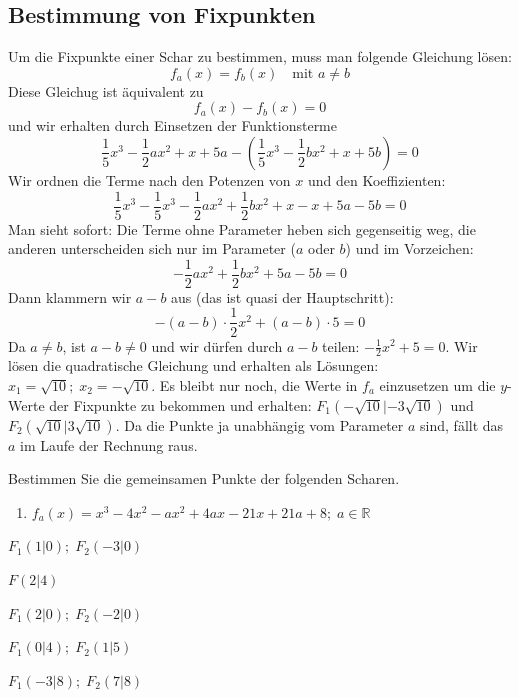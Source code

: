 \documentclass[11pt,a4paper,twoside,fleqn]{article}
\begin{document}
\subsection{Bestimmung von Fixpunkten}
Um die Fixpunkte einer Schar zu bestimmen, muss man folgende Gleichung
lösen:
$$f_a(x)=f_b(x)\quad \textrm{mit } a\neq b$$
Diese Gleichug ist äquivalent zu 
$$ f_a(x)-f_b(x)=0$$
und wir erhalten durch Einsetzen der Funktionsterme
$$\frac 1 5 x^3 -\frac 1 2 ax^2 +x+5a 
-
\left(\frac 1 5 x^3 -\frac 1 2 bx^2+x+5b\right)=0$$
Wir ordnen die Terme nach den Potenzen von $x$ und den Koeffizienten:
$$\frac 1 5 x^3 -
\frac 1 5 x^3
-\frac 1 2 ax^2 +\frac 1 2 bx^2
 +x -x +5a -5b=0$$
Man sieht sofort: Die Terme ohne Parameter heben sich gegenseitig weg,
die anderen unterscheiden sich nur im Parameter ($a$ oder $b$) und im Vorzeichen:
$$-\frac 1 2 ax^2 +\frac 1 2 bx^2 +5a -5b=0$$
Dann klammern wir $a-b$ aus (das ist quasi der Hauptschritt):
$$-(a-b)\cdot \frac 1 2 x^2+ (a-b)\cdot 5 = 0$$
Da $a\neq b$, ist $a-b\neq 0$ und wir dürfen durch $a-b$ teilen:
$-\frac 1 2 x^2+5 = 0$.
Wir lösen die quadratische Gleichung und erhalten als Lösungen:
$x_1=\sqrt{10};\; x_2=-\sqrt{10}$. Es bleibt nur noch, die Werte in
$f_a$ einzusetzen  um die
$y$-Werte der Fixpunkte zu bekommen und erhalten:
$F_1(-\sqrt{10}|-3\sqrt{10})$ und $F_2(\sqrt{10}|3\sqrt{10})$. Da die
Punkte ja unabhängig vom Parameter $a$ sind, fällt das $a$ im Laufe
der Rechnung raus.
\begin{question}

  Bestimmen Sie die gemeinsamen Punkte der folgenden Scharen.
  \begin{enumerate}
  \item $f_a(x)=x^3-4x^2-ax^2+4ax-21x+21a+8;\;a\in\mathbb{R}$
  \end{enumerate}
\end{question}
\begin{solution}
   \begin{enumerate}
    \begin{multicols}{3}
    \item $F_1(1|0);\;F_2(-3|0)$
    \item $F(2|4)$
    \item $F_1(2|0);\;F_2(-2|0)$
    \item $F_1(0|4);\;F_2(1|5)$
    \item $F_1(-3|8);\;F_2(7|8)$
    \end{multicols}
  \end{enumerate}
\end{solution}
\end{document}
